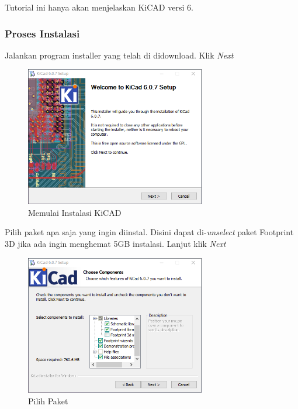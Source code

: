 \documentclass[12pt]{book}
\begin{document}
	Tutorial ini hanya akan menjelaskan KiCAD versi 6.

	\newpage
	\subsubsection{Proses Instalasi}

	Jalankan program installer yang telah di didownload. Klik \textit{Next}

	\begin{figure}[!ht]
		\centering
		\includegraphics[width=0.7\textwidth]{images/installations/kicad_install_0}
		\caption{Memulai Instalasi KiCAD}
	\end{figure}

	Pilih paket apa saja yang ingin diinstal.
	Disini dapat di-\textit{unselect} paket Footprint 3D jika ada ingin menghemat 5GB instalasi.
	Lanjut klik \textit{Next}

	\begin{figure}[!ht]
		\centering
		\includegraphics[width=0.7\textwidth]{images/installations/kicad_install_1}
		\caption{Pilih Paket}
	\end{figure}
\end{document}
